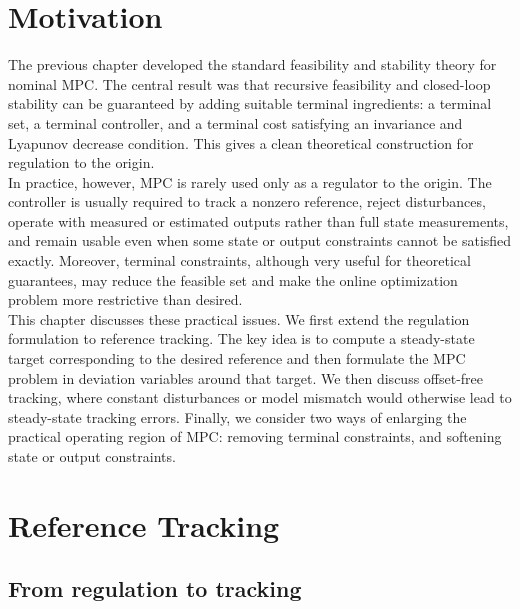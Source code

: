 \section{Motivation}

The previous chapter developed the standard feasibility and stability theory for nominal MPC.
The central result was that recursive feasibility and closed-loop stability can be guaranteed by
adding suitable terminal ingredients: a terminal set, a terminal controller, and a terminal cost
satisfying an invariance and Lyapunov decrease condition. This gives a clean theoretical
construction for regulation to the origin.\\

In practice, however, MPC is rarely used only as a regulator to the origin. The controller is
usually required to track a nonzero reference, reject disturbances, operate with measured or
estimated outputs rather than full state measurements, and remain usable even when some state
or output constraints cannot be satisfied exactly. Moreover, terminal constraints, although very
useful for theoretical guarantees, may reduce the feasible set and make the online optimization
problem more restrictive than desired.\\
This chapter discusses these practical issues. We first extend the regulation formulation to
reference tracking. The key idea is to compute a steady-state target corresponding to the desired
reference and then formulate the MPC problem in deviation variables around that target. We
then discuss offset-free tracking, where constant disturbances or model mismatch would otherwise
lead to steady-state tracking errors. Finally, we consider two ways of enlarging the practical
operating region of MPC: removing terminal constraints, and softening state or output constraints.

\section{Reference Tracking}

\subsection{From regulation to tracking}

